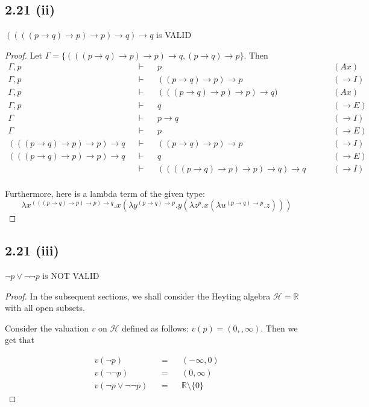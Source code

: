 \documentclass[12pt]{article}
\begin{document}
\subsection*{2.21 (ii)} 
$((((p \rightarrow q) \rightarrow p) \rightarrow p) \rightarrow q) \rightarrow q$ is VALID
\begin{proof}
Let $\Gamma = \{(((p \rightarrow q) \rightarrow p) \rightarrow p) \rightarrow q, (p \rightarrow q) \rightarrow p\}$. Then 
\begin{align*}
    \Gamma, p &&\vdash&& p && &&(Ax)\\
    \Gamma, p &&\vdash&& ((p \rightarrow q) \rightarrow p) \rightarrow p && &&(\rightarrow I)\\
    \Gamma, p &&\vdash&& (((p \rightarrow q) \rightarrow p) \rightarrow p) \rightarrow q) && &&(Ax)\\
    \Gamma, p &&\vdash&& q && &&(\rightarrow E) \\
    \Gamma &&\vdash&& p \rightarrow q && &&(\rightarrow I) \\
    \Gamma &&\vdash&& p && &&(\rightarrow E) \\
    (((p \rightarrow q) \rightarrow p) \rightarrow p) \rightarrow q &&\vdash&& ((p \rightarrow q) \rightarrow p) \rightarrow p && &&(\rightarrow I) \\
    (((p \rightarrow q) \rightarrow p) \rightarrow p) \rightarrow q &&\vdash&& q && &&(\rightarrow E) \\
    &&\vdash&& ((((p \rightarrow q) \rightarrow p) \rightarrow p) \rightarrow q) \rightarrow q && &&(\rightarrow I) \\
\end{align*}

Furthermore, here is a lambda term of the given type: $$\lambda x^{(((p \rightarrow q) \rightarrow p) \rightarrow p) \rightarrow q}. x(\lambda y^{(p \rightarrow q) \rightarrow p}. y(\lambda z^{p}. x(\lambda u^{(p \rightarrow q) \rightarrow p}. z)))$$
\end{proof}

\subsection*{2.21 (iii)} 
$\neg p \vee \neg \neg p$ is NOT VALID

\begin{proof}
In the subsequent sections, we shall consider the Heyting algebra $\mathcal{H} = \mathbb{R}$ with all open subsets. 

Consider the valuation $v$ on $\mathcal{H}$ defined as follows: $v(p) = (0,,\infty)$. Then we get that 

\begin{align*}
    v(\neg p) &&=&& (-\infty, 0) \\
    v(\neg \neg p) &&=&& (0, \infty) \\
    v(\neg p \vee \neg \neg p) &&=&& \mathbb{R} \setminus \{0\}
\end{align*}

\end{proof}
\end{document}
